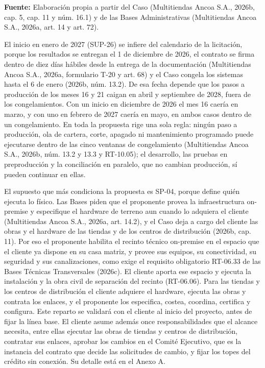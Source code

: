 \documentclass[11pt]{article}
\begin{document}
{\raggedright\textbf{Fuente:} Elaboración propia a partir del Caso (Multitiendas Ancoa S.A., 2026b, cap. 5, cap. 11 y núm. 16.1) y de las Bases Administrativas (Multitiendas Ancoa S.A., 2026a, art. 14 y art. 72).\par}

El inicio en enero de 2027 (SUP-26) se infiere del calendario de la licitación, porque los resultados se entregan el 1 de diciembre de 2026, el contrato se firma dentro de diez días hábiles desde la entrega de la documentación (Multitiendas Ancoa S.A., 2026a, formulario T-20 y art. 68) y el Caso congela los sistemas hasta el 6 de enero (2026b, núm. 13.2). De esa fecha depende que los pasos a producción de los meses 16 y 21 caigan en abril y septiembre de 2028, fuera de los congelamientos. Con un inicio en diciembre de 2026 el mes 16 caería en marzo, y con uno en febrero de 2027 caería en mayo, en ambos casos dentro de un congelamiento. En toda la propuesta rige una sola regla: ningún paso a producción, ola de cartera, corte, apagado ni mantenimiento programado puede ejecutarse dentro de las cinco ventanas de congelamiento (Multitiendas Ancoa S.A., 2026b, núm. 13.2 y 13.3 y RT-10.05); el desarrollo, las pruebas en preproducción y la conciliación en paralelo, que no cambian producción, sí pueden continuar en ellas.

El supuesto que más condiciona la propuesta es SP-04, porque define quién ejecuta lo físico. Las Bases piden que el proponente provea la infraestructura on-premise y especifique el hardware de terreno aun cuando lo adquiera el cliente (Multitiendas Ancoa S.A., 2026a, art. 14.2), y el Caso deja a cargo del cliente las obras y el hardware de las tiendas y de los centros de distribución (2026b, cap. 11). Por eso el proponente habilita el recinto técnico on-premise en el espacio que el cliente ya dispone en su casa matriz, y provee sus equipos, su conectividad, su seguridad y sus canalizaciones, como exige el requisito obligatorio RT-06.33 de las Bases Técnicas Transversales (2026c). El cliente aporta ese espacio y ejecuta la instalación y la obra civil de separación del recinto (RT-06.06). Para las tiendas y los centros de distribución el cliente adquiere el hardware, ejecuta las obras y contrata los enlaces, y el proponente los especifica, costea, coordina, certifica y configura. Este reparto se validará con el cliente al inicio del proyecto, antes de fijar la línea base. El cliente asume además once responsabilidades que el alcance necesita, entre ellas ejecutar las obras de tiendas y centros de distribución, contratar sus enlaces, aprobar los cambios en el Comité Ejecutivo, que es la instancia del contrato que decide las solicitudes de cambio, y fijar los topes del crédito sin conexión. Su detalle está en el Anexo A.
\end{document}

